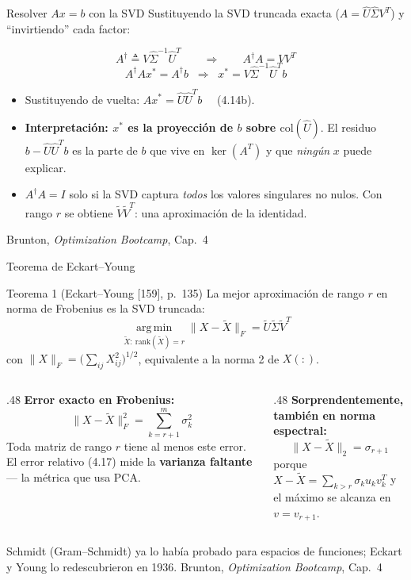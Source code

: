 \documentclass[10pt,aspectratio=169]{beamer}
\newcommand{\fuente}{\vfill{\scriptsize\color{gray}Brunton, \emph{Optimization Bootcamp}, Cap.~4}}
\newcommand{\col}{\mathrm{col}}
\newcommand{\rk}{\mathrm{rank}}
\newcommand{\argmin}{\operatorname*{arg\,min}}
\begin{document}
\begin{frame}{Resolver $Ax=b$ con la SVD}
  \small
  Sustituyendo la SVD truncada exacta ($A=\hat{U}\hat{\Sigma}V^T$) y
  ``invirtiendo'' cada factor:

  \[
    A^{\dagger} \triangleq V\hat{\Sigma}^{-1}\hat{U}^T
    \qquad\Longrightarrow\qquad
    A^{\dagger}A = VV^T \tag{4.12}
  \]
  \[
    A^{\dagger}Ax^* = A^{\dagger}b
    \;\;\Longrightarrow\;\;
    x^* = V\hat{\Sigma}^{-1}\hat{U}^T b \tag{4.13}
  \]

  \begin{itemize}
    \item Sustituyendo de vuelta:
      $Ax^* = \hat{U}\hat{U}^T b$ \ \ (4.14b).
    \item \textbf{Interpretación: $x^*$ es la proyección de $b$ sobre
      $\col(\hat{U})$}. El residuo $b - \hat{U}\hat{U}^Tb$ es la parte de $b$
      que vive en $\ker(A^T)$ y que \emph{ningún} $x$ puede explicar.
    \item $A^{\dagger}A = I$ solo si la SVD captura \emph{todos} los valores
      singulares no nulos. Con rango $r$ se obtiene $\tilde{V}\tilde{V}^T$:
      una aproximación de la identidad.
  \end{itemize}
  \fuente
\end{frame}

\begin{frame}{Teorema de Eckart--Young}
  \small
  \begin{block}{Teorema 1 (Eckart--Young [159], p.~135)}
    La mejor aproximación de rango $r$ en norma de Frobenius es la SVD truncada:
    \[
      \argmin_{\tilde{X}:\ \rk(\tilde{X})=r} \|X - \tilde{X}\|_F
      = \tilde{U}\tilde{\Sigma}\tilde{V}^T \tag{4.15}
    \]
    con $\|X\|_F = \big(\sum_{ij} X_{ij}^2\big)^{1/2}$, equivalente a la
    norma 2 de $X(:)$.
  \end{block}

  \begin{columns}[T,onlytextwidth]
    \begin{column}{.48\textwidth}
      \textbf{Error exacto en Frobenius:}
      \[
        \|X - \tilde{X}\|_F^2 = \sum_{k=r+1}^{m} \sigma_k^2 \tag{4.16}
      \]
      \scriptsize Toda matriz de rango $r$ tiene al menos este error.
      El error relativo (4.17) mide la \textbf{varianza faltante} --- la
      métrica que usa PCA.
    \end{column}
    \begin{column}{.48\textwidth}
      \textbf{Sorprendentemente, también en norma espectral:}
      \[
        \|X - \tilde{X}\|_2 = \sigma_{r+1} \tag{4.19}
      \]
      \scriptsize porque
      $X-\tilde{X} = \sum_{k>r}\sigma_k u_k v_k^T$ y el máximo se alcanza en
      $v = v_{r+1}$.
    \end{column}
  \end{columns}

  \vspace{1mm}
  \footnotesize
  Schmidt (Gram--Schmidt) ya lo había probado para espacios de funciones;
  Eckart y Young lo redescubrieron en 1936.
  \fuente
\end{frame}
\end{document}
